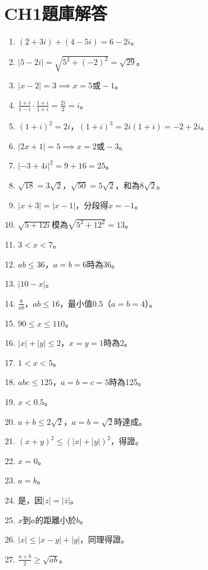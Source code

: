 \section{CH1題庫解答}
\begin{enumerate}[label=\arabic*.]
    \item $(2 + 3i) + (4 - 5i) = 6 - 2i$。
    \item $|5 - 2i| = \sqrt{5^2 + (-2)^2} = \sqrt{29}$。
    \item $|x - 2| = 3 \implies x = 5 \text{或} -1$。
    \item $\frac{1 + i}{1 - i} \cdot \frac{1 + i}{1 + i} = \frac{2i}{2} = i$。
    \item $(1 + i)^2 = 2i$，$(1 + i)^3 = 2i(1 + i) = -2 + 2i$。
    \item $|2x + 1| = 5 \implies x = 2 \text{或} -3$。
    \item $|-3 + 4i|^2 = 9 + 16 = 25$。
    \item $\sqrt{18} = 3\sqrt{2}$，$\sqrt{50} = 5\sqrt{2}$，和為$8\sqrt{2}$。
    \item $|x + 3| = |x - 1|$，分段得$x = -1$。
    \item $\sqrt{5 + 12i}$模為$\sqrt{5^2 + 12^2} = 13$。
    \item $3 < x < 7$。
    \item $ab \leq 36$，$a = b = 6$時為36。
    \item $|10 - x|$。
    \item $\frac{8}{ab}$，$ab \leq 16$，最小值$0.5$（$a = b = 4$）。
    \item $90 \leq x \leq 110$。
    \item $|x| + |y| \leq 2$，$x = y = 1$時為2。
    \item $1 < x < 5$。
    \item $abc \leq 125$，$a = b = c = 5$時為125。
    \item $x < 0.5$。
    \item $a + b \leq 2\sqrt{2}$，$a = b = \sqrt{2}$時達成。
    \item $(x + y)^2 \leq (|x| + |y|)^2$，得證。
    \item $x = 0$。
    \item $a = b$。
    \item 是，因$|z| = |\overline{z}|$。
    \item $x$到$a$的距離小於$b$。
    \item $|x| \leq |x - y| + |y|$，同理得證。
    \item $\frac{a + b}{2} \geq \sqrt{ab}$。

\end{enumerate}
